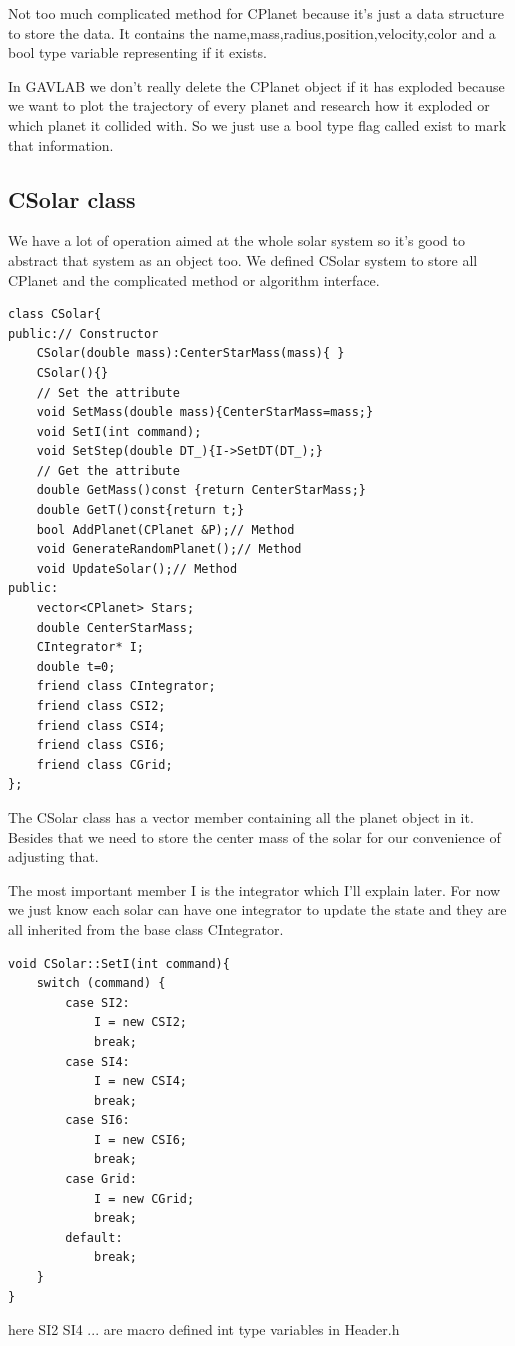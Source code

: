 \documentclass[12pt]{article}
\begin{document}
Not too much complicated method for CPlanet because it's just a data structure
to store the data.
It contains the name,mass,radius,position,velocity,color and a bool type variable representing if it exists.

In GAVLAB we don't really delete the CPlanet object if it has exploded 
because we want to plot the trajectory of every planet and research how it exploded
or which planet it collided with.
So we just use a bool type flag called exist to mark that information.
\clearpage
\subsection{CSolar class}
We have a lot of operation aimed at the whole solar system so it's good to abstract that system
as an object too.
We defined CSolar system to store all CPlanet and the complicated method or algorithm interface.

\begin{lstlisting}[caption=CSolar class]
class CSolar{
public:// Constructor
    CSolar(double mass):CenterStarMass(mass){ }
    CSolar(){}
    // Set the attribute
    void SetMass(double mass){CenterStarMass=mass;}
    void SetI(int command);
    void SetStep(double DT_){I->SetDT(DT_);}
    // Get the attribute
    double GetMass()const {return CenterStarMass;}
    double GetT()const{return t;}
    bool AddPlanet(CPlanet &P);// Method
    void GenerateRandomPlanet();// Method
    void UpdateSolar();// Method
public:
    vector<CPlanet> Stars;
    double CenterStarMass;
    CIntegrator* I;
    double t=0; 
    friend class CIntegrator;
    friend class CSI2;
    friend class CSI4;
    friend class CSI6;
    friend class CGrid;
};
\end{lstlisting}

The CSolar class has a vector member containing all the planet object in it.
Besides that we need to store the center mass of the solar for our convenience of adjusting that.


\clearpage
The most important member I is the integrator which I'll explain later.
For now we just know each solar can have one integrator to update the state 
and they are all inherited from the base class CIntegrator.

\begin{lstlisting}[caption=SetI() ]
void CSolar::SetI(int command){
    switch (command) {
        case SI2:
            I = new CSI2;
            break;
        case SI4:
            I = new CSI4;
            break;
        case SI6:
            I = new CSI6;
            break;
        case Grid:
            I = new CGrid;
            break;
        default:
            break;
    }   
}
\end{lstlisting}
here SI2 SI4 ... are macro defined int type variables in Header.h
\end{document}
